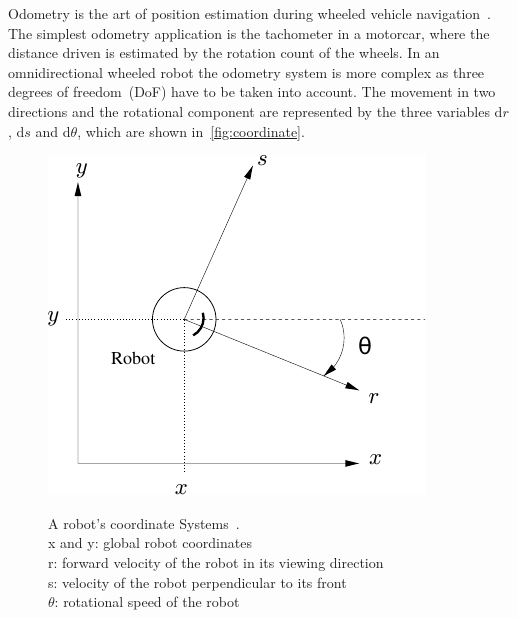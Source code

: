 \documentclass[12pt,a4paper]{article}
\begin{document}

Odometry is the art of position estimation during wheeled vehicle navigation~\cite{webster}.
The simplest odometry application is the tachometer in a motorcar, where the distance driven is estimated by the rotation count of the wheels.
In an omnidirectional wheeled robot the odometry system is more complex as three degrees of freedom~(DoF) have to be taken into account.
The movement in two directions and the rotational component are represented by the three variables d$r$, d$s$ and d$\theta$, which are shown in~\autoref{fig:coordinate}.

\begin{figure}[htbp]
\begin{center}  
\includegraphics[width=0.5\columnwidth]{figures/coordinate_system}
\label{fig:coordinate}
\caption{
A robot's coordinate Systems~\cite{deutsch}.\\
x and y: global robot coordinates\\
r: forward velocity of the robot in its viewing direction\\
s: velocity of the robot perpendicular to its front\\
$\theta$: rotational speed of the robot
}
\end{center}
\end{figure}

\end{document}
